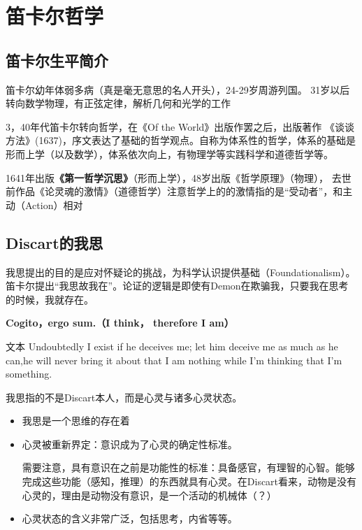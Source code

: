 \documentclass{ctexart}
\begin{document}
\section{笛卡尔哲学}

\subsection{笛卡尔生平简介}

笛卡尔幼年体弱多病（真是毫无意思的名人开头），24-29岁周游列国。
31岁以后转向数学物理，有正弦定律，解析几何和光学的工作

3，40年代笛卡尔转向哲学，在《Of the World》出版作罢之后，出版著作
《谈谈方法》(1637)，序文表达了基础的哲学观点。自称为体系性的哲学，体系的基础是
形而上学（以及数学），体系依次向上，有物理学等实践科学和道德哲学等。

1641年出版\textbf{《第一哲学沉思》}（形而上学），48岁出版《哲学原理》（物理），
去世前作品《论灵魂的激情》（道德哲学）注意哲学上的的激情指的是“受动者”，和主动（Action）相对

\subsection{Discart的我思}

我思提出的目的是应对怀疑论的挑战，为科学认识提供基础（Foundationalism）。笛卡尔提出“我思故我在”。论证的逻辑是即使有Demon在欺骗我，只要我在思考的时候，我就存在。

\textbf{Cogito，ergo sum.（I think， therefore I am）}

\begin{fancybox}{文本}
    Undoubtedly I exist if he deceives me; let him deceive me as much as he can,he will never bring it about that I am nothing while I'm thinking that I'm something. 
\end{fancybox}

我思指的不是Discart本人，而是心灵与诸多心灵状态。

\begin{itemize}
    \item 我思是一个思维的存在着
    \item 心灵被重新界定：意识成为了心灵的确定性标准。
    
    需要注意，具有意识在之前是功能性的标准：具备感官，有理智的心智。能够完成这些功能（感知，推理）的东西就具有心灵。在Discart看来，动物是没有心灵的，理由是动物没有意识，是一个活动的机械体（？）
    \item 心灵状态的含义非常广泛，包括思考，内省等等。
\end{itemize}
\end{document}
